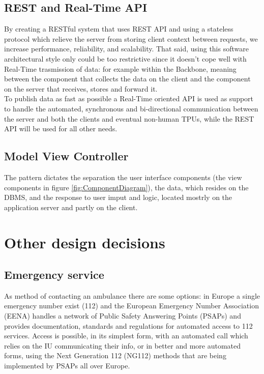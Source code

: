 \subsection{REST and Real-Time API}
\label{subsect:API}
By creating a RESTful system that uses REST API and using a stateless protocol which relieve the server from storing client context between requests, we increase performance, reliability, and scalability. That said, using this software architectural style only could be too restrictive since it doesn't cope well with Real-Time trasmission of data: for example within the Backbone, meaning between the component that collects the data on the client and the component on the server that receives, stores and forward it. \\
To publish data as fast as possible a Real-Time oriented API is used as support to handle the automated, synchronous and bi-directional communication between the server and both the clients and eventual non-human TPUs, while the REST API will be used for all other needs.

\subsection{Model View Controller}
The pattern dictates the separation the user interface components (the view components in figure \ref{fig:ComponentDiagram}), the data, which resides on the DBMS, and the response to user imput and logic, located mostrly on the application server and partly on the client.
\section{Other design decisions}
\subsection{Emergency service}
\label{subsect:ES}
As method of contacting an ambulance there are some options: in Europe a single emergency number exist (112) and the European Emergency Number Association (EENA) handles a network of Public Safety Answering Points (PSAPs) and provides documentation, standards and regulations for automated access to 112 services. Access is possible, in its simplest form, with an automated call which relies on the IU communicating their info, or in better and more automated forms, using the Next Generation 112 (NG112) methods that are being implemented by PSAPs all over Europe.

